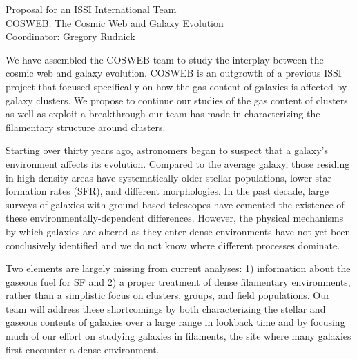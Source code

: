 \documentclass[11pt]{article}
\newcommand{\HRule}{\rule{\linewidth}{0.3mm}}
\begin{document}






\begin{center}
\large{Proposal for an ISSI International Team}\\
\Large{COSWEB: The Cosmic Web and Galaxy Evolution}\\
\medskip
\vspace{-0.2cm}
\large{Coordinator: Gregory Rudnick}\\
\end{center}
We have assembled the COSWEB team to study the interplay between the cosmic web and galaxy evolution. COSWEB is an outgrowth of a previous ISSI project that focused specifically on how the gas content of galaxies is affected by galaxy clusters. We propose to continue our studies of the gas content of clusters as well as exploit a breakthrough our team has made in characterizing the filamentary structure around clusters.

Starting over thirty years ago, astronomers began to suspect that a galaxy's environment affects its evolution.  Compared to the average galaxy, those residing in high density areas have systematically older stellar populations, lower star formation rates (SFR), and  different morphologies.  In the past decade, large surveys of galaxies with ground-based telescopes have cemented the existence of these environmentally-dependent differences. However, the physical mechanisms by which galaxies are altered as they enter dense environments have not yet been conclusively identified and we do not know where different processes dominate.

Two elements are largely missing from current analyses: 1) information about the gaseous fuel for SF and 2) a proper treatment of dense filamentary environments, rather than a simplistic focus on clusters, groups, and field populations. Our team will address these shortcomings by both characterizing the stellar and gaseous contents of galaxies over a large range in lookback time and by focusing much of our effort on studying galaxies in filaments, the site where many galaxies first encounter a dense environment.
\end{document}
